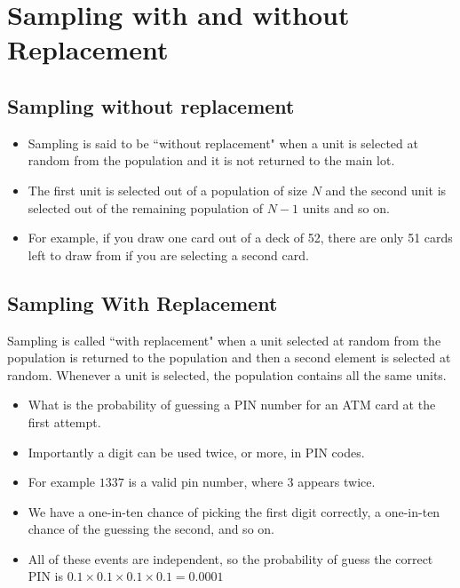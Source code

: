 {
	\section{Sampling with and without Replacement}
	
	\subsection{Sampling without replacement}
	\begin{itemize}
		\item Sampling is said to be ``without replacement" when a unit is selected at random from the population and it is not returned to the main lot. \item The first unit is selected out of a population of size $N$ and the second unit is selected out of the remaining population of  $N-1$ units and so on.
		\item For example, if you draw one card out of a deck of 52, there are only 51 cards left to draw from if you are selecting a second card.
	\end{itemize}



	\subsection{Sampling With Replacement }
	
	Sampling is called ``with replacement" when a unit selected at random from the population is returned to the population and then a second element is selected at random. Whenever a unit is selected, the population contains all the same units.
	\begin{itemize}
		\item What is the probability of guessing a PIN number for an ATM card at the first attempt.
		
		\item Importantly a digit can be used twice, or more, in PIN codes.
		
		\item For example $1337$ is a valid pin number, where $3$ appears twice.
		
		\item
		We have a one-in-ten chance of picking the first digit correctly, a one-in-ten chance of the guessing the second, and so on.
		
		\item All of these events are independent, so the probability of guess the correct PIN is $0.1 \times 0.1 \times 0.1 \times 0.1 = 0.0001$
	\end{itemize}


}
